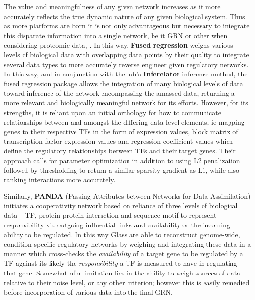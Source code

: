 The value and meaningfulness of any given network increases as it more accurately reflects the true dynamic nature of any given biological system. Thus as more platforms are born it is not only advantageous but necessary to integrate this disparate information into a single network, be it GRN or other when considering \eg proteomic data, \etc. In this way, \textbf{Fused regression} \citep{lam2016fused} weighs various levels of biological data with overlapping data points by their quality to integrate several data types to more accurately reverse engineer given regulatory networks. In this way, and in conjunction with the lab's \textbf{Inferelator}\citep{bonneau2006inferelator} inference method, the fused regression package allows the integration of many biological levels of data toward inference of the network encompassing the amassed data, returning a more relevant and biologically meaningful network for its efforts. However, for its strengths, it is reliant upon an initial orthology for how to communicate relationships between and amongst the differing data level elements, ie mapping genes to their respective TFs in the form of expression values, block matrix of transcription factor expression values and regression coefficient values which define the regulatory relationships between TFs and their target genes. Their approach  calls for parameter optimization in addition to using L2 penalization followed by thresholding to return a similar sparsity gradient as L1, while also ranking interactions more accurately.

Similarly, \textbf{PANDA} (Passing Attributes between Networks for Data Assimilation) initiates a cooperativity network based on reliance of three levels of biological data -- TF, protein-protein interaction and sequence motif to represent responsibility via outgoing influential links and availability or the incoming ability to be regulated. In this way Glass \etal \citep{glass2013passing} are able to reconstruct genome-wide, condition-specific regulatory networks by weighing and integrating these data in a manner which cross-checks the \emph{availability} of a target gene to be regulated by a TF against its likely the \emph{responsibility} a TF is measured to have in regulating that gene. Somewhat of a limitation lies in the ability to weigh sources of data relative to their noise level, or any other criterion; however this is easily remedied before incorporation of various data into the final GRN.

